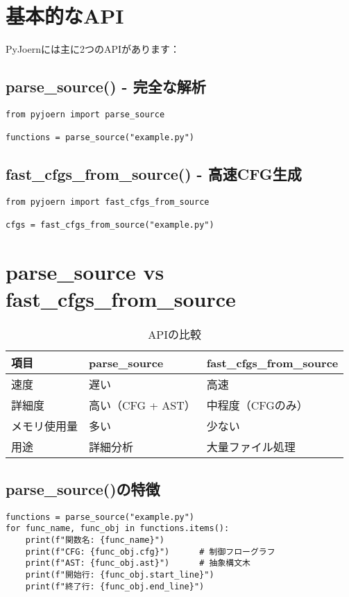 \documentclass[12pt,a4paper]{article}
\begin{document}
\section{基本的なAPI}

PyJoernには主に2つのAPIがあります：

\subsection{parse\_source() - 完全な解析}
\begin{lstlisting}
from pyjoern import parse_source

functions = parse_source("example.py")
\end{lstlisting}

\subsection{fast\_cfgs\_from\_source() - 高速CFG生成}
\begin{lstlisting}
from pyjoern import fast_cfgs_from_source

cfgs = fast_cfgs_from_source("example.py")
\end{lstlisting}

\section{parse\_source vs fast\_cfgs\_from\_source}

\begin{table}[h!]
\centering
\begin{tabular}{|l|l|l|}
\hline
\textbf{項目} & \textbf{parse\_source} & \textbf{fast\_cfgs\_from\_source} \\
\hline
速度 & 遅い & 高速 \\
\hline
詳細度 & 高い（CFG + AST） & 中程度（CFGのみ） \\
\hline
メモリ使用量 & 多い & 少ない \\
\hline
用途 & 詳細分析 & 大量ファイル処理 \\
\hline
\end{tabular}
\caption{APIの比較}
\end{table}

\subsection{parse\_source()の特徴}

\begin{lstlisting}
functions = parse_source("example.py")
for func_name, func_obj in functions.items():
    print(f"関数名: {func_name}")
    print(f"CFG: {func_obj.cfg}")      # 制御フローグラフ
    print(f"AST: {func_obj.ast}")      # 抽象構文木
    print(f"開始行: {func_obj.start_line}")
    print(f"終了行: {func_obj.end_line}")
\end{lstlisting}
\end{document}
